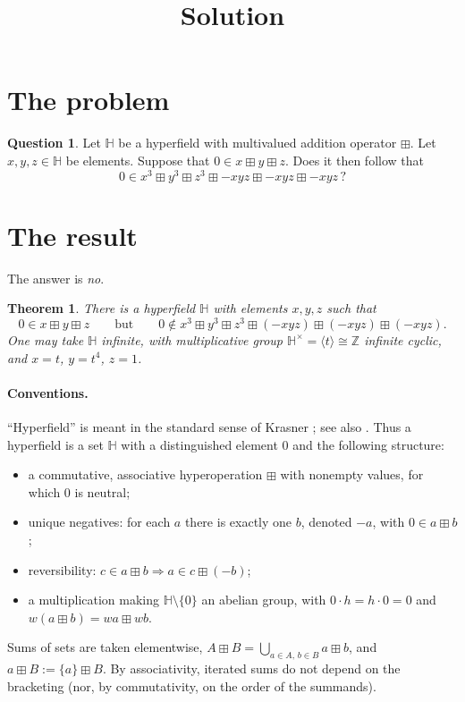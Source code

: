 \documentclass[11pt]{article}
\title{Solution}
\author{}
\date{}
\newtheorem{theorem}{Theorem}
\theoremstyle{definition}
\newtheorem{question}{Question}
\theoremstyle{remark}
\newcommand{\HH}{\mathbb{H}}
\newcommand{\Z}{\mathbb{Z}}
\newcommand{\bp}{\boxplus}
\begin{document}
\maketitle

\section{The problem}

\begin{question}\label{ques:main}
Let $\HH$ be a hyperfield with multivalued addition operator $\bp$. Let $x,y,z\in\HH$ be elements. Suppose that $0\in x\bp y\bp z$. Does it then follow that
\[
0\in x^3\bp y^3\bp z^3\bp -xyz\bp -xyz\bp -xyz\,?
\]
\end{question}

\section{The result}

The answer is \emph{no}.

\begin{theorem}\label{thm:main}
There is a hyperfield $\HH$ with elements $x,y,z$ such that
\[
0\in x\bp y\bp z
\qquad\text{but}\qquad
0\notin x^3\bp y^3\bp z^3\bp(-xyz)\bp(-xyz)\bp(-xyz).
\]
One may take $\HH$ infinite, with multiplicative group $\HH^\times=\langle t\rangle\cong\Z$ infinite cyclic, and $x=t$, $y=t^4$, $z=1$.
\end{theorem}

\paragraph{Conventions.} ``Hyperfield'' is meant in the standard sense of Krasner \cite{Kr57,Kr83}; see also \cite{Viro,BB}. Thus a hyperfield is a set $\HH$ with a distinguished element $0$ and the following structure:
\begin{itemize}[nosep]
\item a commutative, associative hyperoperation $\bp$ with nonempty values, for which $0$ is neutral;
\item unique negatives: for each $a$ there is exactly one $b$, denoted $-a$, with $0\in a\bp b$;
\item reversibility: $c\in a\bp b\Rightarrow a\in c\bp(-b)$;
\item a multiplication making $\HH\setminus\{0\}$ an abelian group, with $0\cdot h=h\cdot 0=0$ and $w(a\bp b)=wa\bp wb$.
\end{itemize}
Sums of sets are taken elementwise, $A\bp B=\bigcup_{a\in A,\,b\in B}a\bp b$, and $a\bp B:=\{a\}\bp B$. By associativity, iterated sums do not depend on the bracketing (nor, by commutativity, on the order of the summands).
\end{document}
